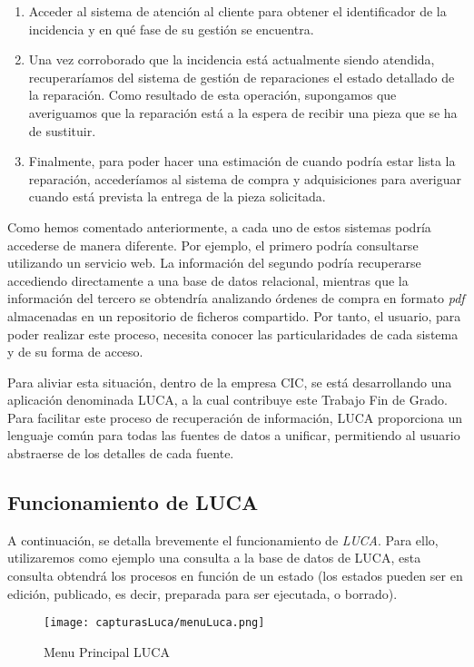 \begin{enumerate}
	\item Acceder al sistema de atención al cliente para obtener el identificador de la incidencia y en qué fase de su gestión se encuentra.
	\item Una vez corroborado que la incidencia está actualmente siendo atendida, recuperaríamos del sistema de gestión de reparaciones el estado detallado de la reparación. Como resultado de esta operación, supongamos que averiguamos que la reparación está a la espera de recibir una pieza que se ha de sustituir.
	\item Finalmente, para poder hacer una estimación de cuando podría estar lista la reparación, accederíamos al sistema de compra y adquisiciones para averiguar cuando está prevista la entrega de la pieza solicitada.
\end{enumerate}

Como hemos comentado anteriormente, a cada uno de estos sistemas podría accederse de manera diferente. Por ejemplo, el primero podría consultarse utilizando un servicio web. La información del segundo podría recuperarse accediendo directamente a una base de datos relacional, mientras que la información del tercero se obtendría analizando órdenes de compra en formato \emph{pdf} almacenadas en un repositorio de ficheros compartido. Por tanto, el usuario, para poder realizar este proceso, necesita conocer las particularidades de cada sistema y de su forma de acceso.

Para aliviar esta situación, dentro de la empresa CIC, se está desarrollando una aplicación denominada LUCA, a la cual contribuye este Trabajo Fin de Grado. Para facilitar este proceso de recuperación de información, LUCA proporciona un lenguaje común para todas las fuentes de datos a unificar, permitiendo al usuario abstraerse de los detalles de cada fuente.

\subsection{Funcionamiento de LUCA}

A continuación, se detalla brevemente el funcionamiento de \emph{LUCA}. Para ello, utilizaremos como ejemplo una consulta a la base de datos de LUCA, esta consulta obtendrá los procesos en función de un estado (los estados pueden ser en edición, publicado, es decir, preparada para ser ejecutada, o borrado). 

\begin{figure}[!tb]
    \centering
 	\texttt{[image: capturasLuca/menuLuca.png]}
	\caption{Menu Principal LUCA}
    \label{fig:menuLuca}
\end{figure}

